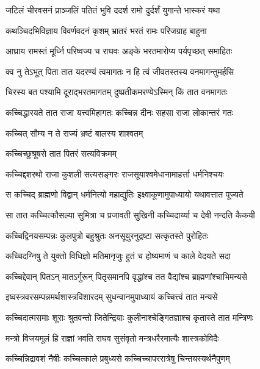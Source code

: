 
\twolineshloka
{जटिलं चीरवसनं प्राञ्जलिं पतितं भुवि}
{ददर्श रामो दुर्दर्शं युगान्ते भास्करं यथा} %

\twolineshloka
{कथञ्चिदभिविज्ञाय विवर्णवदनं कृशम्}
{भ्रातरं भरतं रामः परिजग्राह बाहुना} %

\twolineshloka
{आघ्राय रामस्तं मूर्ध्नि परिष्वज्य च राघवः}
{अङ्के भरतमारोप्य पर्यपृच्छत् समाहितः} %

\twolineshloka
{क्व नु तेऽभूत् पिता तात यदरण्यं त्वमागतः}
{न हि त्वं जीवतस्तस्य वनमागन्तुमर्हसि} %

\twolineshloka
{चिरस्य बत पश्यामि दूराद्भरतमागतम्}
{दुष्प्रतीकमरण्येऽस्मिन् किं तात वनमागतः} %

\twolineshloka
{कच्चिद्धारयते तात राजा यत्त्वमिहागतः}
{कच्चिन्न दीनः सहसा राजा लोकान्तरं गतः} %

\onelineshloka
{कच्चित् सौम्य न ते राज्यं भ्रष्टं बालस्य शाश्वतम्} %

\onelineshloka
{कच्चिच्छुश्रूषसे तात पितरं सत्यविक्रमम्} %

\twolineshloka
{कच्चिद्दशरथो राजा कुशली सत्यसङ्गरः}
{राजसूयाश्वमेधानामाहर्त्ता धर्मनिश्चयः} %

\twolineshloka
{स कच्चिद् ब्राह्मणो विद्वान् धर्मनित्यो महाद्युतिः}
{इक्ष्वाकूणामुपाध्यायो यथावत्तात पूज्यते} %

\twolineshloka
{सा तात कच्चित्कौसल्या सुमित्रा च प्रजावती}
{सुखिनी कच्चिदार्य्या च देवी नन्दति कैकयी} %

\twolineshloka
{कच्चिद्विनयसम्पन्नः कुलपुत्रो बहुश्रुतः}
{अनसूयुरनुद्रष्टा सत्कृतस्ते पुरोहितः} %

\twolineshloka
{कच्चिदग्निषु ते युक्तो विधिज्ञो मतिमानृजुः}
{हुतं च होष्यमाणं च काले वेदयते सदा} %

\twolineshloka
{कच्चिद्देवान् पितऽन् मातऽर्गुरून् पितृसमानपि}
{वृद्धांश्च तत वैद्यांश्च ब्राह्मणांश्चाभिमन्यसे} %

\twolineshloka
{इष्वस्त्रवरसम्पन्नमर्थशास्त्रविशारदम्}
{सुधन्वानमुपाध्यायं कच्चित्त्वं तात मन्यसे} %

\twolineshloka
{कच्चिदात्मसमाः शूराः श्रुतवन्तो जितेन्द्रियाः}
{कुलीनाश्चेङ्गितज्ञाश्च कृतास्ते तात मन्त्रिणः} %

\twolineshloka
{मन्त्रो विजयमूलं हि राज्ञां भवति राघव}
{सुसंवृतो मन्त्रधरैरमात्यैः शास्त्रकोविदैः} %

\twolineshloka
{कच्चिन्निद्रावशं नैषीः कच्चित्काले प्रबुध्यसे}
{कच्चिच्चापररात्रेषु चिन्तयस्यर्थनैपुणम्} %

